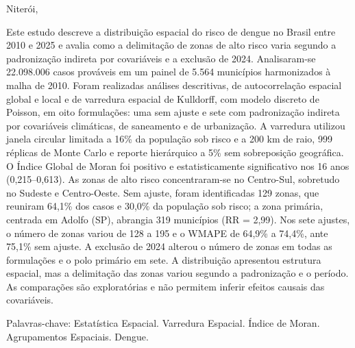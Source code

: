 \documentclass[12pt,a4paper,header]{abnt}
\begin{document}
\begin{folhadeaprovacao}
\begin{minipage}{.7\textwidth}
\begin{flushright}
\begin{espacosimples}

\end{espacosimples}

\end{flushright}

\vspace{1.5cm}
\hfill Niterói, \ABNTdatadata

\end{minipage}

\end{folhadeaprovacao}


%

\begin{resumo}
Este estudo descreve a distribuição espacial do risco de dengue no Brasil entre 2010 e 2025 e avalia como a delimitação de zonas de alto risco varia segundo a padronização indireta por covariáveis e a exclusão de 2024. Analisaram-se 22.098.006 casos prováveis em um painel de 5.564 municípios harmonizados à malha de 2010. Foram realizadas análises descritivas, de autocorrelação espacial global e local e de varredura espacial de Kulldorff, com modelo discreto de Poisson, em oito formulações: uma sem ajuste e sete com padronização indireta por covariáveis climáticas, de saneamento e de urbanização. A varredura utilizou janela circular limitada a 16\% da população sob risco e a 200 km de raio, 999 réplicas de Monte Carlo e reporte hierárquico a 5\% sem sobreposição geográfica. O Índice Global de Moran foi positivo e estatisticamente significativo nos 16 anos (0,215–0,613). As zonas de alto risco concentraram-se no Centro-Sul, sobretudo no Sudeste e Centro-Oeste. Sem ajuste, foram identificadas 129 zonas, que reuniram 64,1\% dos casos e 30,0\% da população sob risco; a zona primária, centrada em Adolfo (SP), abrangia 319 municípios (RR = 2,99). Nos sete ajustes, o número de zonas variou de 128 a 195 e o WMAPE de 64,9\% a 74,4\%, ante 75,1\% sem ajuste. A exclusão de 2024 alterou o número de zonas em todas as formulações e o polo primário em sete. A distribuição apresentou estrutura espacial, mas a delimitação das zonas variou segundo a padronização e o período. As comparações são exploratórias e não permitem inferir efeitos causais das covariáveis.

\vspace{1cm}
\noindent Palavras-chave: Estatística Espacial. Varredura Espacial. Índice de Moran. Agrupamentos Espaciais. Dengue.

\end{resumo}
\end{document}
